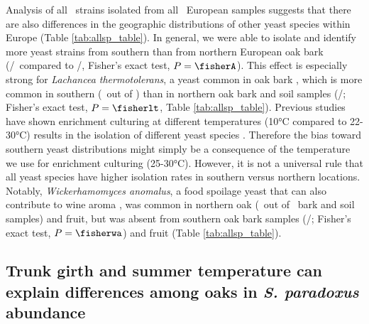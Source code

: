 \documentclass[12pt]{article}
\begin{document}
\begin{linenumbers}
Analysis of all \yeast\ strains isolated from all \samplecount\ European samples suggests that there are also differences in the geographic distributions of other yeast species within Europe (Table \ref{tab:allsp_table}). In general, we were able to isolate and identify more yeast strains from southern than from northern European oak bark (\syeast/\southoaksamples\ compared to \nyeast/\northoaksamples, Fisher's exact test, $P=\fisherA$). This effect is especially strong for \textit{Lachancea thermotolerans}, a yeast common in oak bark \citep{sampaio_natural_2008,sylvester_temperature_2015}, which is more common in southern (\LtSouthOak\ out of \southoaksamples) than in northern oak bark and soil samples (\LtNorthOak/\northoaksamples; Fisher's exact test, $P=\fisherlt$, Table \ref{tab:allsp_table}). Previous studies have shown enrichment culturing at different temperatures (10\si{\degreeCelsius} compared to 22-30\si{\degreeCelsius}) results in the isolation of different yeast species \citep{sampaio_natural_2008,sylvester_temperature_2015}. Therefore the bias toward southern yeast distributions might simply be a consequence of the temperature we use for enrichment culturing (25-30\si{\degreeCelsius}). However, it is not a universal rule that all yeast species have higher isolation rates in southern versus northern locations. Notably, \textit{Wickerhamomyces anomalus}, a food spoilage yeast that can also contribute to wine aroma \citep{passoth_biotechnology_2006}, was common in northern oak (\WaNorthOak\ out of \northoaksamples\ bark and soil samples) and fruit, but was absent from southern oak bark samples (\WaSouthOak/\southoaksamples; Fisher's exact test, $P=\fisherwa$) and fruit (Table \ref{tab:allsp_table}).


\subsection*{Trunk girth and summer temperature can explain differences among oaks in \textit{S. paradoxus} abundance}


\end{linenumbers}
\end{document}
